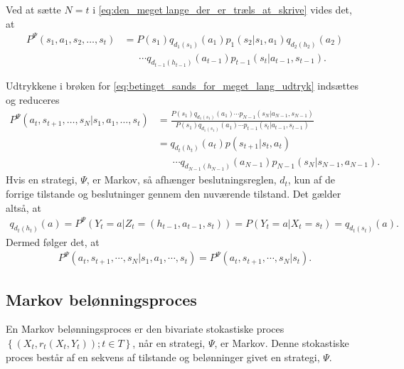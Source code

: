 
Ved at sætte $N=t$ i \eqref{eq:den_meget lange_der_er_træls_at_skrive} vides det, at 
\begin{align*}
    P^\Psi(s_1 , a_1 , s_2 , \dots , s_t) &= P(s_1)q_{d_1(s_1)}(a_1)p_1(s_2|s_1 , a_1)q_{d_2(h_2)}(a_2)\\
     &\phantom{= \ }\cdots q_{d_{t-1}(h_{t-1})}(a_{t-1})p_{t-1}(s_t|a_{t-1} , s_{t-1}).
\end{align*}

Udtrykkene i brøken for \eqref{eq:betinget_sands_for_meget_lang_udtryk} indsættes og reduceres
\begin{align*}
P^\Psi(a_t , s_{t+1}, \dots, s_N | s_1 , a_1 , \dots , s_t) &=\frac{P(s_1)q_{d_1(s_1)}(a_1)
    \cdots p_{N-1}(s_N|a_{N-1} , s_{N-1})}{P(s_1)q_{d_1(s_1)}(a_1)
    \cdots p_{t-1}(s_t|a_{t-1} , s_{t-1})}\\
    &= q_{d_t(h_t)}(a_t)p(s_{t+1}|s_t , a_t)\\
    &\phantom{= \ } \cdots q_{d_{N-1}(h_{N-1})}(a_{N-1})p_{N-1}(s_N|s_{N-1} , a_{N-1}).
\end{align*}
Hvis en strategi, $\Psi$, er Markov, så afhænger beslutningsreglen, $d_t$, kun af de forrige tilstande og beslutninger gennem den nuværende tilstand. Det gælder altså, at 
\begin{align*}
    q_{d_t(h_t)}(a)= P^\Psi \left(Y_t = a | Z_t = (h_{t-1} , a_{t-1} , s_t) \right) = P \left(Y_t = a | X_t = s_t\right) = q_{d_t(s_t)}(a).
\end{align*}
Dermed følger det, at
\begin{align*}
    P^{\Psi}\left(a_t , s_{t+1} , \cdots , s_N|s_1 , a_1 , \cdots , s_t\right)=P^{\Psi}\left(a_t , s_{t+1} , \cdots , s_N|s_t\right).
\end{align*}

\subsection{Markov belønningsproces}
En Markov belønningsproces er den bivariate stokastiske proces $\left\{\left(X_t, r_t(X_t, Y_t)\right); t \in T\right\}$, når en strategi, $\Psi$, er Markov. Denne stokastiske proces består af en sekvens af tilstande og belønninger givet en strategi, $\Psi$. 

